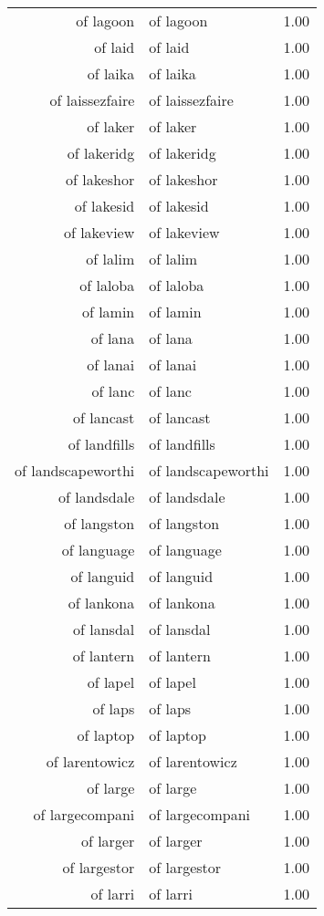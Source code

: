 \begin{table}[ht]
\begin{tabular}{rlr}
  of lagoon & of lagoon & 1.00 \\ 
  of laid & of laid & 1.00 \\ 
  of laika & of laika & 1.00 \\ 
  of laissezfaire & of laissezfaire & 1.00 \\ 
  of laker & of laker & 1.00 \\ 
  of lakeridg & of lakeridg & 1.00 \\ 
  of lakeshor & of lakeshor & 1.00 \\ 
  of lakesid & of lakesid & 1.00 \\ 
  of lakeview & of lakeview & 1.00 \\ 
  of lalim & of lalim & 1.00 \\ 
  of laloba & of laloba & 1.00 \\ 
  of lamin & of lamin & 1.00 \\ 
  of lana & of lana & 1.00 \\ 
  of lanai & of lanai & 1.00 \\ 
  of lanc & of lanc & 1.00 \\ 
  of lancast & of lancast & 1.00 \\ 
  of landfills & of landfills & 1.00 \\ 
  of landscapeworthi & of landscapeworthi & 1.00 \\ 
  of landsdale & of landsdale & 1.00 \\ 
  of langston & of langston & 1.00 \\ 
  of language & of language & 1.00 \\ 
  of languid & of languid & 1.00 \\ 
  of lankona & of lankona & 1.00 \\ 
  of lansdal & of lansdal & 1.00 \\ 
  of lantern & of lantern & 1.00 \\ 
  of lapel & of lapel & 1.00 \\ 
  of laps & of laps & 1.00 \\ 
  of laptop & of laptop & 1.00 \\ 
  of larentowicz & of larentowicz & 1.00 \\ 
  of large & of large & 1.00 \\ 
  of largecompani & of largecompani & 1.00 \\ 
  of larger & of larger & 1.00 \\ 
  of largestor & of largestor & 1.00 \\ 
  of larri & of larri & 1.00 \\ 

\end{tabular}
\end{table}
